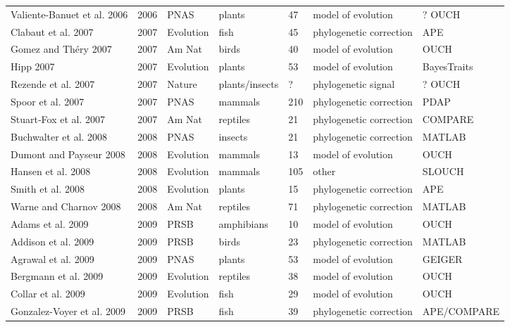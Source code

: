 \begin{landscape}
\begin{center}
\begin{longtable}{p{6cm}llllll}
Valiente-Banuet et al. 2006   &   2006    &   PNAS    &   plants  &   47  &   model of evolution  &   ? OUCH    \\
Clabaut et al. 2007   &   2007    &   Evolution   &   fish    &   45  &   phylogenetic correction &   APE \\
Gomez and Th\'{e}ry 2007  &   2007    &   Am Nat  &   birds   &   40  &   model of evolution  &   OUCH    \\
Hipp 2007 &   2007    &   Evolution   &   plants  &   53  &   model of evolution  &   BayesTraits \\
Rezende et al. 2007   &   2007    &   Nature  &   plants/insects  &   ?   &   phylogenetic signal &   ? OUCH    \\
Spoor et al. 2007 &   2007    &   PNAS    &   mammals &   210 &   phylogenetic correction &   PDAP    \\
Stuart‐Fox et al. 2007    &   2007    &   Am Nat  &   reptiles    &   21  &   phylogenetic correction &   COMPARE \\
Buchwalter et al. 2008    &   2008    &   PNAS    &   insects &   21  &   phylogenetic correction &   MATLAB  \\
Dumont and Payseur 2008   &   2008    &   Evolution   &   mammals &   13  &   model of evolution  &   OUCH    \\
Hansen et al. 2008    &   2008    &   Evolution   &   mammals &   105 &   other   &   SLOUCH  \\
Smith et al. 2008 &   2008    &   Evolution   &   plants  &   15  &   phylogenetic correction &   APE \\
Warne and Charnov 2008    &   2008    &   Am Nat  &   reptiles    &   71  &   phylogenetic correction &   MATLAB  \\
Adams et al. 2009 &   2009    &   PRSB    &   amphibians  &   10  &   model of evolution  &   OUCH    \\
Addison et al. 2009   &   2009    &   PRSB    &   birds   &   23  &   phylogenetic correction &   MATLAB  \\
Agrawal et al. 2009   &   2009    &   PNAS    &   plants  &   53  &   model of evolution  &   GEIGER  \\
Bergmann et al. 2009  &   2009    &   Evolution   &   reptiles    &   38  &   model of evolution  &   OUCH    \\
Collar et al. 2009    &   2009    &   Evolution   &   fish    &   29  &   model of evolution  &   OUCH    \\
Gonzalez-Voyer et al. 2009    &   2009    &   PRSB    &   fish    &   39  &   phylogenetic correction &   APE/COMPARE \\

\end{longtable}
\end{center}
\end{landscape}
